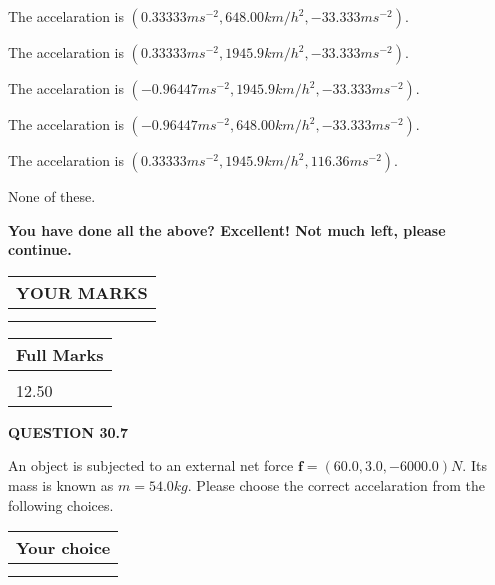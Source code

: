 \documentclass[12pt]{article}
\begin{document}
 
The accelaration is
$(
0.33333ms^{-2},
648.00km/h^2,
-33.333ms^{-2}
).
$
 
 
The accelaration is
$(
0.33333ms^{-2},
1945.9km/h^2,
-33.333ms^{-2}
).
$
 
 
The accelaration is
$(
-0.96447ms^{-2},
1945.9km/h^2,
-33.333ms^{-2}
).
$
 
 
The accelaration is
$(
-0.96447ms^{-2},
648.00km/h^2,
-33.333ms^{-2}
).
$
 
 
The accelaration is
$(
0.33333ms^{-2},
1945.9km/h^2,
116.36ms^{-2}
).
$
 
 
 None of these.
 
 
 
 

 
\vspace{0.3in}
   
   
\vspace{0.3in}
{\textbf{\LARGE{You have done all the above? Excellent! Not much left, please continue.}}}
\vspace{0.3in}
   
   
  
\vspace{0.2in}
  
\noindent\begin{tabular}{|l|}
\hline
 YOUR MARKS  \\
\hline
 \\ 
 \\ 
\hline
\end{tabular}
\hspace{0.05in} \begin{tabular}{|l|}
\hline
 Full Marks  \\
\hline
 \\ 
12.50 \\
\hline
\end{tabular}
{\textbf{\Large{QUESTION
30.7 
}}}
  
  
 
An object is subjected to an external net force $\mathbf{f}=
(60.0 , 3.0 , -6000.0) N$.
Its mass is known as $m= %
54.0 kg$.
Please choose the correct accelaration from the following choices.
  
  
\noindent\hspace{3.0in} \begin{tabular}{|l|}
\hline
Your choice \\
\hline
 \\ 
 \\ 
\hline
\end{tabular}
  
\end{document}
